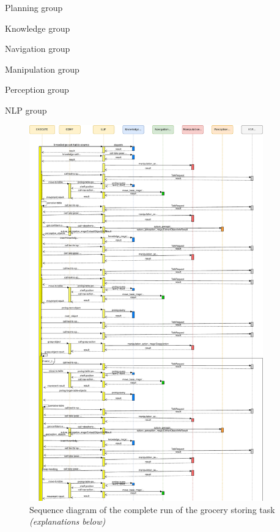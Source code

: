 \documentclass[main.tex]{subfiles}
\begin{document}
	\begin{planning}
	Planning group
	\end{planning}
	\begin{knowledge}
	Knowledge group
	\end{knowledge}
	\begin{navigation}
	Navigation group
	\end{navigation}
	\begin{manipulation}
	Manipulation group
	\end{manipulation}
	\begin{perception}
	Perception group
	\end{perception}
	\begin{nlp}
	NLP group
	\end{nlp}
	
		\begin{figure}[H]
			\centering
			\includegraphics[width=0.9\textwidth]{pictures/diagramms/grocery_01_seq}
			\caption{Sequence diagram of the complete run of the grocery storing task \textit{(explanations below)}}
			\label{grocery_seq_01}
		\end{figure}
\end{document}
